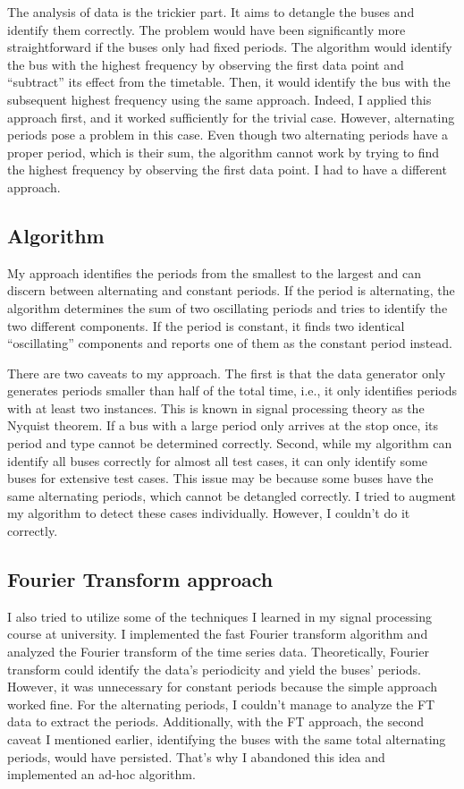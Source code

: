 \documentclass[12pt,a4paper]{article}
\begin{document}
The analysis of data is the trickier part. It aims to detangle the buses and
identify them correctly. The problem would have been significantly more
straightforward if the buses only had fixed periods. The algorithm would
identify the bus with the highest frequency by observing the first data point
and ``subtract'' its effect from the timetable. Then, it would identify the bus
with the subsequent highest frequency using the same approach. Indeed, I applied
this approach first, and it worked sufficiently for the trivial case. However,
alternating periods pose a problem in this case. Even though two alternating
periods have a proper period, which is their sum, the algorithm cannot work by
trying to find the highest frequency by observing the first data point. I had to
have a different approach.

\subsection{Algorithm}

My approach identifies the periods from the smallest to the largest and can
discern between alternating and constant periods. If the period is alternating,
the algorithm determines the sum of two oscillating periods and tries to
identify the two different components. If the period is constant, it finds two
identical ``oscillating'' components and reports one of them as the constant
period instead.

There are two caveats to my approach. The first is that the data generator only
generates periods smaller than half of the total time, i.e., it only identifies
periods with at least two instances. This is known in signal processing theory
as the Nyquist theorem. If a bus with a large period only arrives at the stop
once, its period and type cannot be determined correctly. Second, while my
algorithm can identify all buses correctly for almost all test cases, it can
only identify some buses for extensive test cases. This issue may be because
some buses have the same alternating periods, which cannot be detangled
correctly. I tried to augment my algorithm to detect these cases individually.
However, I couldn't do it correctly.

\subsection{Fourier Transform approach}

I also tried to utilize some of the techniques I learned in my signal processing
course at university. I implemented the fast Fourier transform algorithm and
analyzed the Fourier transform of the time series data. Theoretically, Fourier
transform could identify the data's periodicity and yield the buses' periods.
However, it was unnecessary for constant periods because the simple approach
worked fine. For the alternating periods, I couldn't manage to analyze the FT
data to extract the periods. Additionally, with the FT approach, the second
caveat I mentioned earlier, identifying the buses with the same total
alternating periods, would have persisted. That's why I abandoned this idea and
implemented an ad-hoc algorithm.

%
\end{document}

